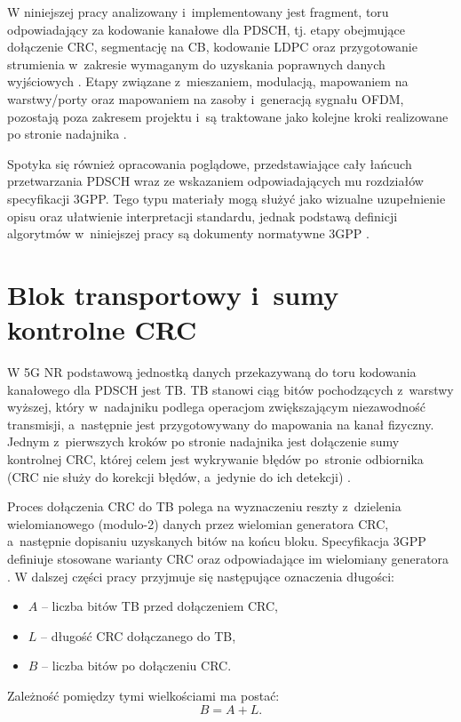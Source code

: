 W niniejszej pracy analizowany i~implementowany jest fragment, toru odpowiadający za kodowanie kanałowe dla PDSCH, tj. etapy obejmujące dołączenie CRC, segmentację na CB, kodowanie LDPC oraz przygotowanie strumienia w~zakresie wymaganym do uzyskania poprawnych danych wyjściowych \cite{bib:3gpp_38212}. Etapy związane z~mieszaniem, modulacją, mapowaniem na warstwy/porty oraz mapowaniem na zasoby i~generacją sygnału OFDM, pozostają poza zakresem projektu i~są traktowane jako kolejne kroki realizowane po stronie nadajnika \cite{bib:3gpp_38211}.

Spotyka się również opracowania poglądowe, przedstawiające cały łańcuch przetwarzania PDSCH wraz ze wskazaniem odpowiadających mu rozdziałów specyfikacji 3GPP\cite{bib:sharetechnote_pdsch}. Tego typu materiały mogą służyć jako wizualne uzupełnienie opisu oraz ułatwienie interpretacji standardu, jednak podstawą definicji algorytmów w~niniejszej pracy są dokumenty normatywne 3GPP \cite{bib:3gpp_38212,bib:3gpp_38211}.


\section{Blok transportowy i~sumy kontrolne CRC}
\label{sec:analiza_crc}

W 5G NR podstawową jednostką danych przekazywaną do toru kodowania kanałowego dla PDSCH jest TB. TB stanowi ciąg bitów pochodzących z~warstwy wyższej, który w~nadajniku podlega operacjom zwiększającym niezawodność transmisji, a~następnie jest przygotowywany do mapowania na kanał fizyczny. Jednym z~pierwszych kroków po stronie nadajnika jest dołączenie sumy kontrolnej CRC, której celem jest wykrywanie błędów po~stronie odbiornika (CRC nie służy do korekcji błędów, a~jedynie do ich detekcji) \cite{bib:3gpp_38212}.

Proces dołączenia CRC do TB polega na wyznaczeniu reszty z~dzielenia wielomianowego (modulo-2) danych przez wielomian generatora CRC, a~następnie dopisaniu uzyskanych bitów na końcu bloku. Specyfikacja 3GPP definiuje stosowane warianty CRC oraz odpowiadające im wielomiany generatora \cite{bib:3gpp_38212}. W dalszej części pracy przyjmuje się następujące oznaczenia długości:
\begin{itemize}
  \item $A$ -- liczba bitów TB przed dołączeniem CRC,
  \item $L$ -- długość CRC dołączanego do TB,
  \item $B$ -- liczba bitów po dołączeniu CRC.
\end{itemize}
Zależność pomiędzy tymi wielkościami ma postać:
\begin{equation}
B = A + L.
\label{eq:tb_crc_length}
\end{equation}

